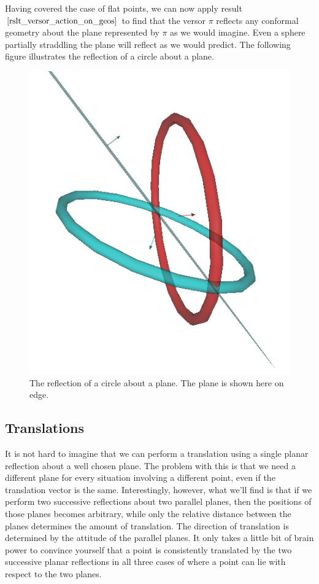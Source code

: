 \documentclass[12pt]{article}
\begin{document}
Having covered the case of flat points, we can now apply result $\eqref{rslt_versor_action_on_geos}$
to find that the versor $\pi$ reflects any conformal geometry about the plane represented by
$\pi$ as we would imagine.  Even a sphere partially straddling the plane will reflect as we would predict.
The following figure illustrates the reflection of a circle about a plane.
\begin{figure}[H]
\centering
\includegraphics[scale=0.3]{ReflectionOfCircleAboutPlaneFigure}
\caption{The reflection of a circle about a plane.  The plane is shown here on edge.}
\end{figure}

\subsection{Translations}

It is not hard to imagine that we can perform a translation
using a single planar reflection about a well chosen plane.
The problem with this is that we need a different plane for
every situation involving a different point, even if the translation
vector is the same.  Interestingly, however, what we'll find is that
if we perform two successive reflections about two parallel planes, then
the positions of those planes becomes arbitrary, while only the relative
distance between the planes determines the amount of translation.
The direction of translation is determined by the attitude of the parallel planes.
It only takes a little bit of brain power to convince yourself that a point is consistently
translated by the two successive planar reflections in all three cases of where
a point can lie with respect to the two planes.
\end{document}

